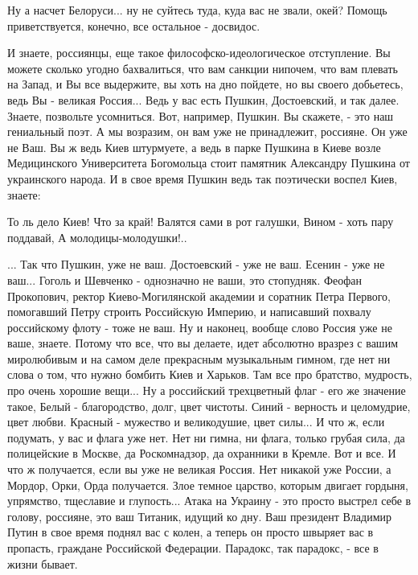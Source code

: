 Ну а насчет Белоруси... ну не суйтесь туда, куда вас не звали, окей? Помощь
приветствуется, конечно, все остальное - досвидос.

И знаете, россиянцы, еще такое философско-идеологическое отступление.  Вы
можете сколько угодно бахвалиться, что вам санкции нипочем, что вам плевать на
Запад, и Вы все выдержите, вы хоть на дно пойдете, но вы своего добьетесь, ведь
Вы - великая Россия...  Ведь у вас есть Пушкин, Достоевский, и так далее.
Знаете, позвольте усомниться. Вот, например, Пушкин. Вы скажете, - это наш
гениальный поэт. А мы возразим, он вам уже не принадлежит, россияне. Он уже не
Ваш.  Вы ж ведь Киев штурмуете, а ведь в парке Пушкина в Киеве возле
Медицинского Университета Богомольца стоит памятник Александру Пушкина от
украинского народа. И в свое время Пушкин ведь так поэтически воспел Киев,
знаете: 

\begin{zzquote}
То ль дело Киев! Что за край!  Валятся сами в рот галушки,
Вином - хоть пару поддавай, А молодицы-молодушки!..
\end{zzquote}

... Так что Пушкин, уже не ваш. Достоевский - уже не ваш. Есенин - уже не
ваш... Гоголь и Шевченко - однозначно не ваши, это стопудняк. Феофан
Прокопович, ректор Киево-Могилянской академии и соратник Петра Первого,
помогавший Петру строить Российскую Империю, и написавший похвалу российскому
флоту - тоже не ваш. Ну и наконец, вообще слово Россия уже не ваше, знаете.
Потому что все, что вы делаете, идет абсолютно вразрез с вашим миролюбивым и на
самом деле прекрасным музыкальным гимном, где нет ни слова о том, что нужно
бомбить Киев и Харьков. Там все про братство, мудрость, про очень хорошие
вещи... Ну а российский трехцветный флаг - его же значение такое, Белый -
благородство, долг, цвет чистоты. Синий - верность и целомудрие, цвет любви.
Красный - мужество и великодушие, цвет силы... И что ж, если подумать, у вас и
флага уже нет.  Нет ни гимна, ни флага, только грубая сила, да полицейские в
Москве, да Роскомнадзор, да охранники в Кремле. Вот и все.  И что ж получается,
если вы уже не великая Россия. Нет никакой уже России, а Мордор, Орки, Орда
получается.  Злое темное царство, которым двигает гордыня, упрямство, тщеславие
и глупость... Атака на Украину - это просто выстрел себе в голову, россияне,
это ваш Титаник, идущий ко дну. Ваш президент Владимир Путин в свое время
поднял вас с колен, а теперь он просто швыряет вас в пропасть, граждане
Российской Федерации. Парадокс, так парадокс, - все в жизни бывает.

